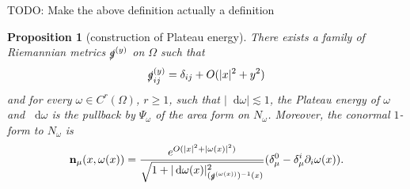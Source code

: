 \documentclass[reqno,12pt,letterpaper]{amsart}
\newcommand*\dif{\mathop{}\!\mathrm{d}}
\newcommand{\normal}{\mathbf n}
\newtheorem{proposition}[theorem]{Proposition}
\theoremstyle{definition}
\numberwithin{equation}{section}
\begin{document}
TODO: Make the above definition actually a definition

\begin{proposition}[construction of Plateau energy]\label{construction of Plateau energy}
There exists a family of Riemannian metrics $\slashed g^{(y)}$ on $\Omega$ such that
\begin{equation}\label{decay of slashed metric}
\slashed g^{(y)}_{ij} = \delta_{ij} + O(|x|^2 + y^2)
\end{equation}
and for every $\omega \in C^r(\Omega)$, $r \geq 1$, such that $|\dif \omega| \lesssim 1$, the Plateau energy of $\omega$ and $\dif \omega$ is the pullback by $\Psi_\omega$ of the area form on $N_\omega$.
Moreover, the conormal $1$-form to $N_\omega$ is
\begin{equation}\label{conormal}
\normal_\mu(x, \omega(x)) = \frac{e^{O(|x|^2 + |\omega(x)|^2)}}{\sqrt{1 + |\dif \omega(x)|^2_{(\slashed g^{(\omega(x))})^{-1}(x)}}} (\delta^0_\mu - \delta^i_\mu \partial_i \omega(x)).
\end{equation}
\end{proposition}
\end{document}
